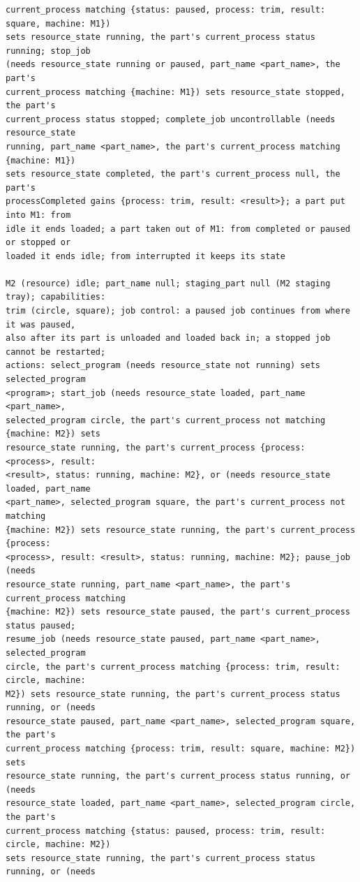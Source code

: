 \documentclass[preprint,12pt,authoryear]{elsarticle}
\begin{document}
\begin{lstlisting}[style=recorded]
current_process matching {status: paused, process: trim, result: square, machine: M1})
sets resource_state running, the part's current_process status running; stop_job
(needs resource_state running or paused, part_name <part_name>, the part's
current_process matching {machine: M1}) sets resource_state stopped, the part's
current_process status stopped; complete_job uncontrollable (needs resource_state
running, part_name <part_name>, the part's current_process matching {machine: M1})
sets resource_state completed, the part's current_process null, the part's
processCompleted gains {process: trim, result: <result>}; a part put into M1: from
idle it ends loaded; a part taken out of M1: from completed or paused or stopped or
loaded it ends idle; from interrupted it keeps its state

M2 (resource) idle; part_name null; staging_part null (M2 staging tray); capabilities:
trim (circle, square); job control: a paused job continues from where it was paused,
also after its part is unloaded and loaded back in; a stopped job cannot be restarted;
actions: select_program (needs resource_state not running) sets selected_program
<program>; start_job (needs resource_state loaded, part_name <part_name>,
selected_program circle, the part's current_process not matching {machine: M2}) sets
resource_state running, the part's current_process {process: <process>, result:
<result>, status: running, machine: M2}, or (needs resource_state loaded, part_name
<part_name>, selected_program square, the part's current_process not matching
{machine: M2}) sets resource_state running, the part's current_process {process:
<process>, result: <result>, status: running, machine: M2}; pause_job (needs
resource_state running, part_name <part_name>, the part's current_process matching
{machine: M2}) sets resource_state paused, the part's current_process status paused;
resume_job (needs resource_state paused, part_name <part_name>, selected_program
circle, the part's current_process matching {process: trim, result: circle, machine:
M2}) sets resource_state running, the part's current_process status running, or (needs
resource_state paused, part_name <part_name>, selected_program square, the part's
current_process matching {process: trim, result: square, machine: M2}) sets
resource_state running, the part's current_process status running, or (needs
resource_state loaded, part_name <part_name>, selected_program circle, the part's
current_process matching {status: paused, process: trim, result: circle, machine: M2})
sets resource_state running, the part's current_process status running, or (needs

\end{lstlisting}
\end{document}
